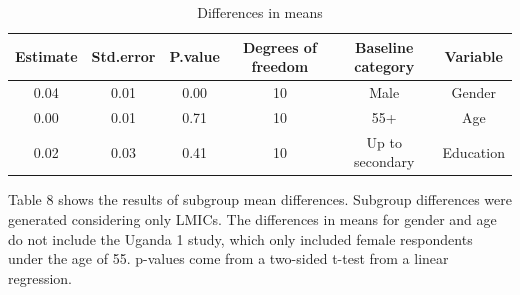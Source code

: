 \documentclass[
  12pt,
]{article}
\begin{document}
\pagebreak

\begin{table}[!h]

\caption{\label{tab:dmeans}Differences in means}
\centering
\fontsize{10}{12}\selectfont
\begin{threeparttable}
\begin{tabular}[t]{cccccc}
\toprule
\textbf{Estimate} & \textbf{Std.error} & \textbf{P.value} & \textbf{Degrees of freedom} & \textbf{Baseline category} & \textbf{Variable}\\
\midrule
0.04 & 0.01 & 0.00 & 10 & Male & Gender\\
0.00 & 0.01 & 0.71 & 10 & 55+ & Age\\
0.02 & 0.03 & 0.41 & 10 & Up to secondary & Education\\
\bottomrule
\end{tabular}
\begin{tablenotes}
\item Table 8 shows the results of subgroup mean differences. Subgroup differences were generated considering only LMICs. The differences in means for gender and age do not include the Uganda 1 study, which only included female respondents under the age of 55. p-values come from a two-sided t-test from a linear regression.
\end{tablenotes}
\end{threeparttable}
\end{table}

\clearpage
\end{document}
